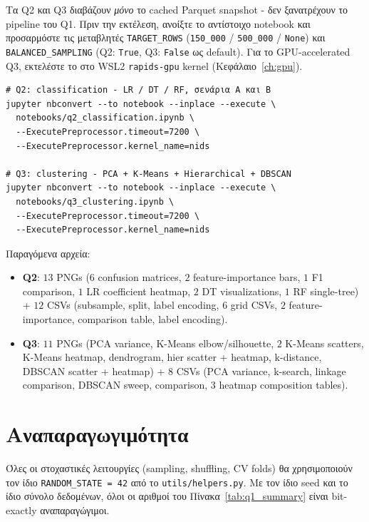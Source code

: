 \documentclass[12pt,a4paper,twoside]{book}
\begin{document}
Τα Q2 και Q3 διαβάζουν \emph{μόνο} το cached Parquet snapshot - δεν
ξανατρέχουν το pipeline του Q1. Πριν την εκτέλεση, ανοίξτε το αντίστοιχο
notebook και προσαρμόστε τις μεταβλητές \texttt{TARGET\_ROWS}
(\texttt{150\_000} / \texttt{500\_000} / \texttt{None}) και
\texttt{BALANCED\_SAMPLING} (Q2: \texttt{True}, Q3: \texttt{False} ως
default). Για το GPU-accelerated Q3, εκτελέστε το στο WSL2 \texttt{rapids-gpu}
kernel (Κεφάλαιο~\ref{ch:gpu}).

\begin{tcolorbox}[myCustomStyle={Run}]
\begin{lstlisting}[style=myBashStyle]
# Q2: classification - LR / DT / RF, σενάρια A και B
jupyter nbconvert --to notebook --inplace --execute \
  notebooks/q2_classification.ipynb \
  --ExecutePreprocessor.timeout=7200 \
  --ExecutePreprocessor.kernel_name=nids

# Q3: clustering - PCA + K-Means + Hierarchical + DBSCAN
jupyter nbconvert --to notebook --inplace --execute \
  notebooks/q3_clustering.ipynb \
  --ExecutePreprocessor.timeout=7200 \
  --ExecutePreprocessor.kernel_name=nids
\end{lstlisting}
\end{tcolorbox}

Παραγόμενα αρχεία:
\begin{itemize}
    \item \textbf{Q2}: \(13\) PNGs (\(6\) confusion matrices, \(2\)
    feature-importance bars, \(1\) F1 comparison, \(1\) LR coefficient
    heatmap, \(2\) DT visualizations, \(1\) RF single-tree) + \(12\)
    CSVs (subsample, split, label encoding, \(6\) grid CSVs, \(2\)
    feature-importance, comparison table, label encoding).
    \item \textbf{Q3}: \(11\) PNGs (PCA variance, K-Means
    elbow/silhouette, \(2\) K-Means scatters, K-Means heatmap,
    dendrogram, hier scatter + heatmap, k-distance, DBSCAN scatter +
    heatmap) + \(8\) CSVs (PCA variance, k-search, linkage comparison,
    DBSCAN sweep, comparison, \(3\) heatmap composition tables).
\end{itemize}

\section{Αναπαραγωγιμότητα}

Όλες οι στοχαστικές λειτουργίες (sampling, shuffling, CV folds) θα
χρησιμοποιούν τον ίδιο \texttt{RANDOM\_STATE = 42} από το
\texttt{utils/helpers.py}. Με τον ίδιο seed και το ίδιο
σύνολο δεδομένων, όλοι οι αριθμοί του Πίνακα~\ref{tab:q1_summary} είναι
bit-exactly αναπαραγώγιμοι.
\end{document}
